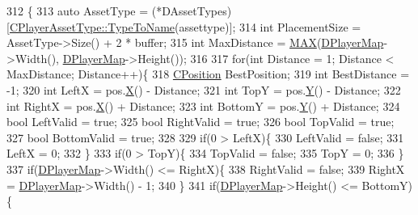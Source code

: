 \begin{DoxyCode}
312                                                                                                            
                                     \{
313     \textcolor{keyword}{auto} AssetType = (*DAssetTypes)[\hyperlink{classCPlayerAssetType_a66ce89c35b74940e9fc947a1f4b9e770}{CPlayerAssetType::TypeToName}(assettype)];
314     \textcolor{keywordtype}{int} PlacementSize = AssetType->Size() + 2 * buffer;
315     \textcolor{keywordtype}{int} MaxDistance = \hyperlink{GameModel_8cpp_afa99ec4acc4ecb2dc3c2d05da15d0e3f}{MAX}(\hyperlink{classCPlayerData_a452163191cd4603e1e38dd8d4bb9691c}{DPlayerMap}->Width(), \hyperlink{classCPlayerData_a452163191cd4603e1e38dd8d4bb9691c}{DPlayerMap}->Height()); 
316     
317     \textcolor{keywordflow}{for}(\textcolor{keywordtype}{int} Distance = 1; Distance < MaxDistance; Distance++)\{
318         \hyperlink{classCPosition}{CPosition} BestPosition;
319         \textcolor{keywordtype}{int} BestDistance = -1;
320         \textcolor{keywordtype}{int} LeftX = pos.\hyperlink{classCPosition_a9a6b94d3b91df1492d166d9964c865fc}{X}() - Distance;
321         \textcolor{keywordtype}{int} TopY = pos.\hyperlink{classCPosition_a1aa8a30e2f08dda1f797736ba8c13a87}{Y}() - Distance;
322         \textcolor{keywordtype}{int} RightX = pos.\hyperlink{classCPosition_a9a6b94d3b91df1492d166d9964c865fc}{X}() + Distance;
323         \textcolor{keywordtype}{int} BottomY = pos.\hyperlink{classCPosition_a1aa8a30e2f08dda1f797736ba8c13a87}{Y}() + Distance;
324         \textcolor{keywordtype}{bool} LeftValid = \textcolor{keyword}{true};
325         \textcolor{keywordtype}{bool} RightValid = \textcolor{keyword}{true};
326         \textcolor{keywordtype}{bool} TopValid = \textcolor{keyword}{true};
327         \textcolor{keywordtype}{bool} BottomValid = \textcolor{keyword}{true};
328         
329         \textcolor{keywordflow}{if}(0 > LeftX)\{
330             LeftValid = \textcolor{keyword}{false};
331             LeftX = 0;
332         \}
333         \textcolor{keywordflow}{if}(0 > TopY)\{
334             TopValid = \textcolor{keyword}{false};
335             TopY = 0;
336         \}
337         \textcolor{keywordflow}{if}(\hyperlink{classCPlayerData_a452163191cd4603e1e38dd8d4bb9691c}{DPlayerMap}->Width() <= RightX)\{
338             RightValid = \textcolor{keyword}{false};
339             RightX = \hyperlink{classCPlayerData_a452163191cd4603e1e38dd8d4bb9691c}{DPlayerMap}->Width() - 1;
340         \}
341         \textcolor{keywordflow}{if}(\hyperlink{classCPlayerData_a452163191cd4603e1e38dd8d4bb9691c}{DPlayerMap}->Height() <= BottomY)\{

\end{DoxyCode}
